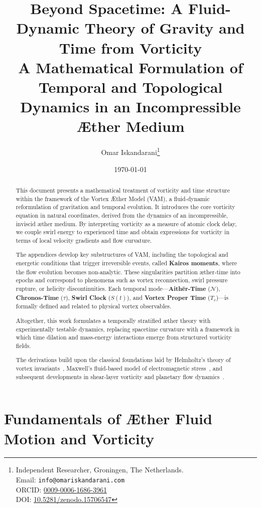 \documentclass[a4paper,12pt]{article}
\title{
    \textbf{Beyond Spacetime: A Fluid-Dynamic Theory of Gravity and Time from Vorticity}\\[0.5em]
    \large A Mathematical Formulation of Temporal and Topological Dynamics in an Incompressible Æther Medium\\[0.5em]
}
\author{
    Omar Iskandarani\thanks{
        Independent Researcher, Groningen, The Netherlands.\\
        Email: \texttt{info@omariskandarani.com}\\
        ORCID: \href{https://orcid.org/0009-0006-1686-3961}{0009-0006-1686-3961}\\
        DOI: \href{https://doi.org/10.5281/zenodo.15706547}{10.5281/zenodo.15706547}
    }
}
\date{\today}
\begin{document}
    \maketitle
    \vspace{-2ex}


    \begin{abstract}
        This document presents a mathematical treatment of vorticity and time structure within the framework of the Vortex Æther Model (VAM), a fluid-dynamic reformulation of gravitation and temporal evolution. It introduces the core vorticity equation in natural coordinates, derived from the dynamics of an incompressible, inviscid æther medium. By interpreting vorticity as a measure of atomic clock delay, we couple swirl energy to experienced time and obtain expressions for vorticity in terms of local velocity gradients and flow curvature.

        The appendices develop key substructures of VAM, including the topological and energetic conditions that trigger irreversible events, called \textbf{Kairos moments}, where the flow evolution becomes non-analytic. These singularities partition æther-time into epochs and correspond to phenomena such as vortex reconnection, swirl pressure rupture, or helicity discontinuities. Each temporal mode—\textbf{Aithēr-Time} (\( \mathcal{N} \)), \textbf{Chronos-Time} (\( \tau \)), \textbf{Swirl Clock} (\( S(t) \)), and \textbf{Vortex Proper Time} (\( T_v \))—is formally defined and related to physical vortex observables.

        Altogether, this work formulates a temporally stratified æther theory with experimentally testable dynamics, replacing spacetime curvature with a framework in which time dilation and mass-energy interactions emerge from structured vorticity fields.

        The derivations build upon the classical foundations laid by Helmholtz's theory of vortex invariants~\cite{helmholtz1858integralsvortex}, Maxwell's fluid-based model of electromagnetic stress~\cite{maxwell1861pressure}, and subsequent developments in shear-layer vorticity and planetary flow dynamics~\cite{lamb1932, rossby1939}.


    \end{abstract}


    \vfill
%
    \newpage
    \tableofcontents
    \newpage


    \appendix
    \def\standalonechapter{false}
        \section{Fundamentals of Æther Fluid Motion and Vorticity}
\end{document}
